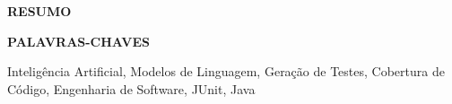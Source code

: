 \newpage
\thispagestyle{empty}
\begin{center}
    \uppercase{\textbf{Resumo}}
\end{center}

\begin{center}
    \uppercase{\textbf{Palavras-chaves}}
\end{center}
Inteligência Artificial, Modelos de Linguagem, Geração de Testes, Cobertura de Código, Engenharia de Software, JUnit, Java


